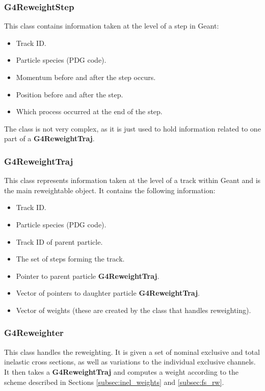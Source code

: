 \documentclass[12pt]{article}
\begin{document}
\subsubsection{G4ReweightStep}
This class contains information taken at the level of a step in Geant:
\begin{itemize}
	\item Track ID.
	\item Particle species (PDG code).
	\item Momentum before and after the step occurs.
	\item Position before and after the step.
	\item Which process occurred at the end of the step.
\end{itemize}

The class is not very complex, as it is just used to hold information related to one part of a \textbf{G4ReweightTraj}.

\subsubsection{G4ReweightTraj}
This class represents information taken at the level of a track within Geant and is the main reweightable object. It contains the following information:
\begin{itemize}
	\item Track ID.
	\item Particle species (PDG code).
	\item Track ID of parent particle.
	\item The set of steps forming the track.
	\item Pointer to parent particle \textbf{G4ReweightTraj}.
	\item Vector of pointers to daughter particle \textbf{G4ReweightTraj}.
	\item Vector of weights (these are created by the class that handles reweighting).
\end{itemize}

\subsubsection{G4Reweighter}
This class handles the reweighting. It is given a set of nominal exclusive and total inelastic cross sections, as well as variations to the individual exclusive channels. It then takes a \textbf{G4ReweightTraj} and computes a weight according to the scheme described in Sections \ref{subsec:inel_weights} and \ref{subsec:fs_rw}.
\end{document}
